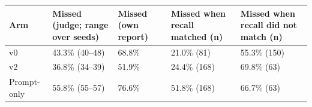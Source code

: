 \begin{tabularx}{\linewidth}{@{}lYYYY@{}}
\toprule
Arm & Missed (judge; range over seeds) & Missed (own report) & Missed when recall matched (n) & Missed when recall did not match (n)\\
\midrule
v0 & 43.3\% (40--48) & 68.8\% & 21.0\% (81) & 55.3\% (150)\\
v2 & 36.8\% (34--39) & 51.9\% & 24.4\% (168) & 69.8\% (63)\\
Prompt-only & 55.8\% (55--57) & 76.6\% & 51.8\% (168) & 66.7\% (63)\\
\bottomrule
\end{tabularx}
